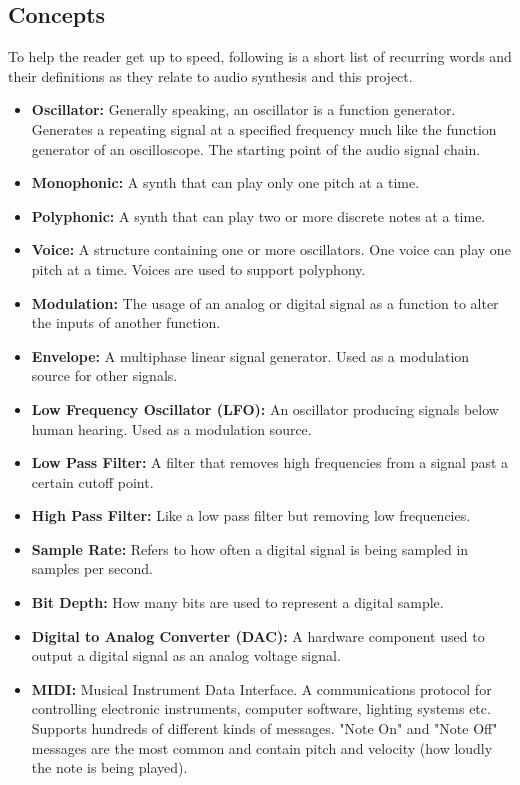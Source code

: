 \documentclass[acmlarge,screen]{acmart}
\begin{document}
\subsection{Concepts}
	To help the reader get up to speed, following is a short list of recurring words and their definitions as they relate to audio synthesis and this project.
	\begin{itemize}
		\item \textbf{Oscillator:} Generally speaking, an oscillator is a function generator. Generates a repeating signal at a specified frequency much like the function generator of an oscilloscope. The starting point of the audio signal chain.
		\item \textbf{Monophonic:} A synth that can play only one pitch at a time.
		\item \textbf{Polyphonic:} A synth that can play two or more discrete notes at a time.
		\item \textbf{Voice:} A structure containing one or more oscillators. One voice can play one pitch at a time. Voices are used to support polyphony.
		\item \textbf{Modulation:} The usage of an analog or digital signal as a function to alter the inputs of another function.
		\item \textbf{Envelope:} A multiphase linear signal generator. Used as a modulation source for other signals.
		\item \textbf{Low Frequency Oscillator (LFO):} An oscillator producing signals below human hearing. Used as a modulation source.
		\item \textbf{Low Pass Filter:} A filter that removes high frequencies from a signal past a certain cutoff point.
		\item \textbf{High Pass Filter:} Like a low pass filter but removing low frequencies.
		\item \textbf{Sample Rate:} Refers to how often a digital signal is being sampled in samples per second.
		\item \textbf{Bit Depth:} How many bits are used to represent a digital sample.
		\item \textbf{Digital to Analog Converter (DAC):} A hardware component used to output a digital signal as an analog voltage signal.
		\item \textbf{MIDI:} Musical Instrument Data Interface. A communications protocol for controlling electronic instruments, computer software, lighting systems etc. Supports hundreds of different kinds of messages. "Note On" and "Note Off" messages are the most common and contain pitch and velocity (how loudly the note is being played).
	\end{itemize}
\end{document}
